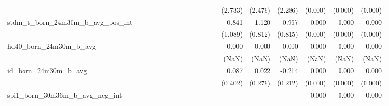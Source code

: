 \begin{tabular}{lrrrrrrrrrrrrrrrrrr}
                                            &              &              &              &              &              &              &              &              &               &              &              &               &      (2.733) &      (2.479) &       (2.286) &      (0.000) &      (0.000) &       (0.000) \\ 
stdm\_t\_born\_24m30m\_b\_avg\_pos\_int     &              &              &              &              &              &              &              &              &               &              &              &               &       -0.841 &       -1.120 &        -0.957 &        0.000 &        0.000 &         0.000 \\ 
                                            &              &              &              &              &              &              &              &              &               &              &              &               &      (1.089) &      (0.812) &       (0.815) &      (0.000) &      (0.000) &       (0.000) \\ 
hd40\_born\_24m30m\_b\_avg                  &              &              &              &              &              &              &              &              &               &              &              &               &        0.000 &        0.000 &         0.000 &        0.000 &        0.000 &         0.000 \\ 
                                            &              &              &              &              &              &              &              &              &               &              &              &               &        (NaN) &        (NaN) &         (NaN) &        (NaN) &        (NaN) &         (NaN) \\ 
id\_born\_24m30m\_b\_avg                    &              &              &              &              &              &              &              &              &               &              &              &               &        0.087 &        0.022 &        -0.214 &        0.000 &        0.000 &         0.000 \\ 
                                            &              &              &              &              &              &              &              &              &               &              &              &               &      (0.402) &      (0.279) &       (0.212) &      (0.000) &      (0.000) &       (0.000) \\ 
spi1\_born\_30m36m\_b\_avg\_neg\_int        &              &              &              &              &              &              &              &              &               &              &              &               &              &              &               &        0.000 &        0.000 &         0.000 \\ 

\end{tabular}
